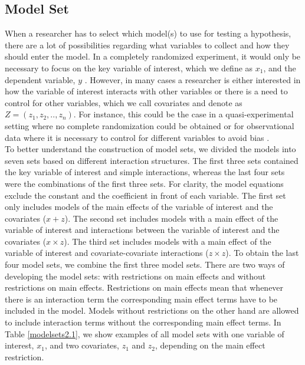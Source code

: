 \subsection{Model Set}
When a researcher has to select which model(s) to use for testing a hypothesis, there are a lot of possibilities regarding what variables to collect and how they should enter the model. In a completely randomized experiment, it would only be necessary to focus on the key variable of interest, which we define as $x_1$, and the dependent variable, $y$ \citep{angrist2008mostly}. However, in many cases a researcher is either interested in how the variable of interest interacts with other variables or there is a need to control for other variables, which we call covariates and denote as $Z=(z_1,z_2,..,z_n)$. For instance, this could be the case in a quasi-experimental setting where no complete randomization could be obtained or for observational data where it is necessary to control for different variables to avoid bias \citep{angrist2008mostly}. \\ 
To better understand the construction of model sets, we divided the models into seven sets based on different interaction structures. The first three sets contained the key variable of interest and simple interactions, whereas the last four sets were the combinations of the first three sets. For clarity, the model equations exclude the constant and the coefficient in front of each variable. The first set only includes models of the main effects of the variable of interest and the covariates ($x + z$). The second set includes models with a main effect of the variable of interest and interactions between the variable of interest and the covariates ($x \times z$). The third set includes models with a main effect of the variable of interest and covariate-covariate interactions ($z \times z$).
To obtain the last four model sets, we combine the first three model sets. There are two ways of developing the model sets: with restrictions on main effects and without restrictions on main effects. Restrictions on main effects mean that whenever there is an interaction term the corresponding main effect terms have to be included in the model. Models without restrictions on the other hand are allowed to include interaction terms without the corresponding main effect terms. In Table \ref{modelsets2.1}, we show examples of all model sets with one variable of interest, $x_{1}$, and two covariates, $z_{1}$ and $z_{2}$, depending on the main effect restriction. \\
 
